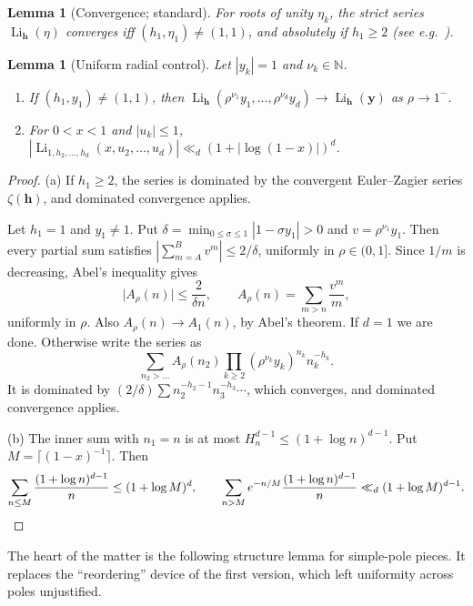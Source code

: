 \documentclass[11pt]{amsart}
\newtheorem{lemma}[theorem]{Lemma}
\theoremstyle{definition}
\theoremstyle{remark}
\numberwithin{equation}{section}
\newcommand{\N}{\mathbb{N}}
\newcommand{\Li}{\operatorname{Li}}
\newcommand{\hb}{\mathbf{h}}
\newcommand{\yb}{\mathbf{y}}
\begin{document}
\begin{lemma}[Convergence; standard]\label{lem:conv}
For roots of unity $\eta_k$, the strict series $\Li_\hb(\eta)$ converges iff $(h_1,\eta_1)\ne(1,1)$, and absolutely if $h_1\ge2$ (see e.g.\ \cite{Zha16,Gon98,Rac02}).
\end{lemma}

\begin{lemma}[Uniform radial control]\label{lem:radial}
Let $|y_k|=1$ and $\nu_k\in\N$.
\begin{enumerate}[label=(\alph*),leftmargin=2em]
\item If $(h_1,y_1)\ne(1,1)$, then $\Li_\hb(\rho^{\nu_1}y_1,\dots,\rho^{\nu_d}y_d)\to\Li_\hb(\yb)$ as $\rho\to1^-$.
\item For $0<x<1$ and $|u_k|\le1$, $|\Li_{1,h_2,\dots,h_d}(x,u_2,\dots,u_d)|\ll_d(1+|\log(1-x)|)^d$.
\end{enumerate}
\end{lemma}

\begin{proof}
(a) If $h_1\ge2$, the series is dominated by the convergent Euler--Zagier series $\zeta(\hb)$, and dominated convergence applies.

Let $h_1=1$ and $y_1\ne1$. Put $\delta=\min_{0\le\sigma\le1}|1-\sigma y_1|>0$ and $v=\rho^{\nu_1}y_1$. Then every partial sum satisfies $|\sum_{m=A}^{B}v^m|\le2/\delta$, uniformly in $\rho\in(0,1]$. Since $1/m$ is decreasing, Abel's inequality gives
\[
\Big|A_\rho(n)\Big|\le\frac{2}{\delta n},\qquad A_\rho(n)=\sum_{m>n}\frac{v^m}{m},
\]
uniformly in $\rho$. Also $A_\rho(n)\to A_1(n)$, by Abel's theorem. If $d=1$ we are done. Otherwise write the series as
\[
\sum_{n_2>\dots}A_\rho(n_2)\prod_{k\ge2}(\rho^{\nu_k}y_k)^{n_k}n_k^{-h_k}.
\]
It is dominated by $(2/\delta)\sum n_2^{-h_2-1}n_3^{-h_3}\cdots$, which converges, and dominated convergence applies.

(b) The inner sum with $n_1=n$ is at most $H_n^{d-1}\le(1+\log n)^{d-1}$. Put $M=\lceil(1-x)^{-1}\rceil$. Then
\[
\sum_{n\le M}\frac{(1+\log n)^{d-1}}{n}\le(1+\log M)^d,
\qquad
\sum_{n>M}e^{-n/M}\frac{(1+\log n)^{d-1}}{n}\ll_d(1+\log M)^{d-1}. \qedhere
\]
\end{proof}

The heart of the matter is the following structure lemma for simple-pole pieces. It replaces the ``reordering'' device of the first version, which left uniformity across poles unjustified.
\end{document}
